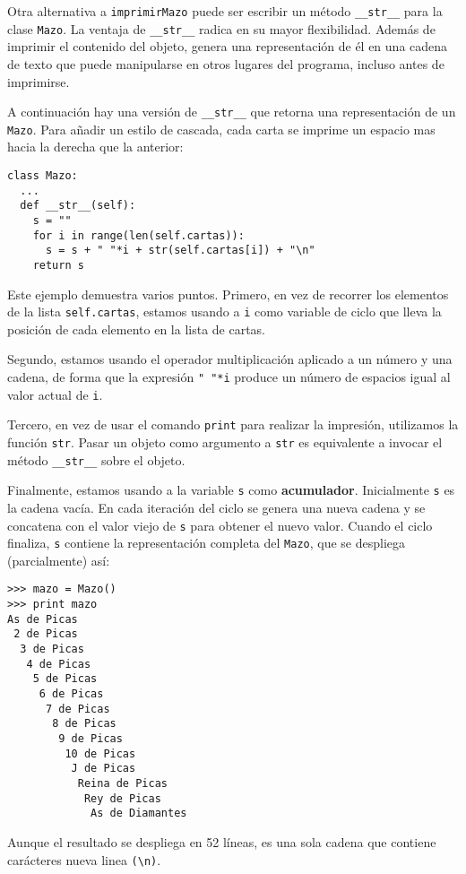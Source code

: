 Otra alternativa a  \texttt{imprimirMazo} puede ser escribir un método
 \texttt{\_\_str\_\_} para la clase \texttt{Mazo}.  La ventaja de
 \texttt{\_\_str\_\_} radica en su mayor flexibilidad.  Además de imprimir el contenido del objeto, 
genera una representación de él en una cadena de texto que puede manipularse en otros lugares del 
programa, incluso antes de imprimirse.

A continuación hay una versión de  \texttt{\_\_str\_\_} que retorna una representación de un  \texttt{Mazo}. 
Para añadir un estilo de cascada, cada carta se imprime un espacio mas hacia la derecha que la anterior:

\beforeverb
\begin{verbatim}
class Mazo:
  ...
  def __str__(self):
    s = ""
    for i in range(len(self.cartas)):
      s = s + " "*i + str(self.cartas[i]) + "\n"
    return s
\end{verbatim}
\afterverb
%
Este ejemplo demuestra varios puntos. Primero, en vez de recorrer los elementos
de la lista  \texttt{self.cartas}, estamos usando a \texttt{i} como variable 
de ciclo que lleva la posición de cada elemento en la lista de cartas.

Segundo, estamos usando el operador multiplicación aplicado a un número y una cadena, 
de forma que la expresión \verb+" "*i+ produce un número de espacios igual al valor actual de  \texttt{i}.

Tercero, en vez de usar el comando  \texttt{print} para realizar la impresión, utilizamos la función  \texttt{str}. 
Pasar un objeto como argumento a \texttt{str} es equivalente a invocar el método \texttt{\_\_str\_\_} sobre el objeto.



Finalmente, estamos usando a la variable \texttt{s} como {\bf acumulador}.
Inicialmente \texttt{s} es la cadena vacía.  En cada iteración del ciclo se 
genera una nueva cadena y se concatena con el valor viejo de  \texttt{s} para
obtener el nuevo valor. Cuando el ciclo finaliza, \texttt{s} contiene la 
representación completa del \texttt{Mazo}, que se despliega (parcialmente) así:



\beforeverb
\begin{verbatim}
>>> mazo = Mazo()
>>> print mazo
As de Picas
 2 de Picas
  3 de Picas
   4 de Picas
    5 de Picas
     6 de Picas
      7 de Picas
       8 de Picas
        9 de Picas
         10 de Picas
          J de Picas
           Reina de Picas
            Rey de Picas
             As de Diamantes
\end{verbatim}
\afterverb
%
Aunque el resultado se despliega en 52 líneas, es una sola cadena que
contiene carácteres nueva linea \verb+(\n)+.


